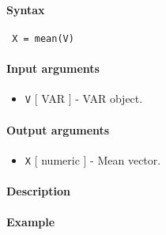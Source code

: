 


	\paragraph{Syntax}
 
 \begin{verbatim}
 X = mean(V)
 \end{verbatim}
 
 \paragraph{Input arguments}
 
 \begin{itemize}
 \item
   \texttt{V} {[} VAR {]} - VAR object.
 \end{itemize}
 
 \paragraph{Output arguments}
 
 \begin{itemize}
 \item
   \texttt{X} {[} numeric {]} - Mean vector.
 \end{itemize}
 
 \paragraph{Description}
 
 \paragraph{Example}


